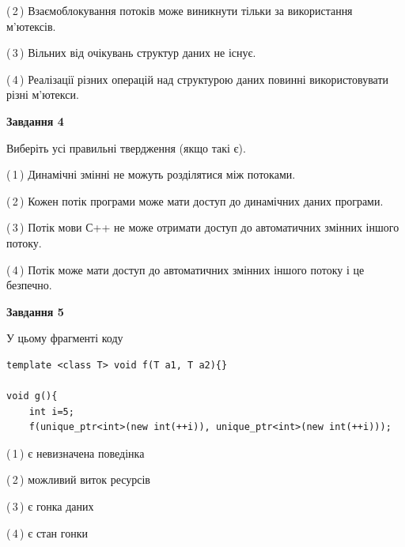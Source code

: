 \documentclass[12pt, ukrainian]{article}
\begin{document}
\begin {large}
{(\,2\,) Взаємоблокування потоків може виникнути тільки за використання м’ютексів.%

(\,3\,) Вільних від очікувань структур даних не існує.%

(\,4\,) Реалізації різних операцій над структурою даних повинні використовувати різні м’ютекси.%



\begin{center}
\textbf{Завдання 4}
\end{center}
Виберіть усі правильні твердження (якщо такі є).\par
\vspace{2mm}

(\,1\,) Динамічні змінні не можуть розділятися між потоками.%

(\,2\,) Кожен потік програми може мати доступ до динамічних даних програми.%

(\,3\,) Потік мови С++ не може отримати доступ до автоматичних змінних іншого потоку.%

(\,4\,) Потік може мати доступ до автоматичних змінних іншого потоку і це безпечно.%



\begin{center}
\textbf{Завдання 5}
\end{center}
У цьому фрагменті коду
\begin{verbatim}
template <class T> void f(T a1, T a2){}

void g(){
    int i=5;
    f(unique_ptr<int>(new int(++i)), unique_ptr<int>(new int(++i)));
\end{verbatim}

(\,1\,) є невизначена поведінка%

(\,2\,) можливий виток ресурсів%

(\,3\,) є гонка даних%

(\,4\,) є стан гонки%


}
\end {large}
\end{document}
